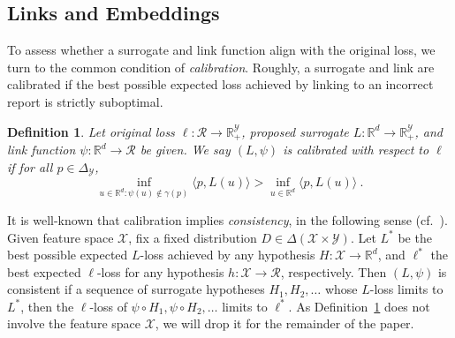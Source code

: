 \documentclass[12pt]{article}
\newcommand{\Comments}{1}
\newcommand{\mynote}[2]{\ifnum\Comments=1\textcolor{#1}{#2}\fi}
\newcommand{\mytodo}[2]{\ifnum\Comments=1%
  \todo[linecolor=#1!80!black,backgroundcolor=#1,bordercolor=#1!80!black]{#2}\fi}
\newcommand{\raf}[1]{\mynote{green}{[RF: #1]}}
\newcommand{\btw}[1]{}%
\newcommand{\reals}{\mathbb{R}}
\newcommand{\simplex}{\Delta_\Y}
\newcommand{\R}{\mathcal{R}}
\newcommand{\X}{\mathcal{X}}
\newcommand{\Y}{\mathcal{Y}}
\newcommand{\inprod}[2]{\langle #1, #2 \rangle}%
\newtheorem{definition}{Definition}
\begin{document}
\subsection{Links and Embeddings}

To assess whether a surrogate and link function align with the original loss, we turn to the common condition of \emph{calibration}.
Roughly, a surrogate and link are calibrated if the best possible expected loss achieved by linking to an incorrect report is strictly suboptimal.
\btw{Separated stuff commented out}



\begin{definition}
  \label{def:calibrated}
  Let original loss $\ell:\R\to\reals^\Y_+$, proposed surrogate $L:\reals^d\to\reals^\Y_+$, and link function $\psi:\reals^d\to\R$ be given.
  We say $(L,\psi)$ is \emph{calibrated} with respect to $\ell$ if
for all $p \in \simplex$,
  \begin{equation}
    \label{eq:calibrated}
  \inf_{u \in \reals^d : \psi(u) \not\in \gamma(p)} \inprod{p}{L(u)} > \inf_{u \in \reals^d} \inprod{p}{L(u)}~.
  \end{equation}
\end{definition}
It is well-known that calibration implies \emph{consistency}, in the following sense (cf.~\cite{agarwal2015consistent}).
Given feature space $\X$, fix a fixed distribution $D \in \Delta(\X\times\Y)$.
Let $L^*$ be the best possible expected $L$-loss achieved by any hypothesis $H:\X\to\reals^d$, and $\ell^*$ the best expected $\ell$-loss for any hypothesis $h:\X\to\R$, respectively.
Then $(L,\psi)$ is consistent if a sequence of surrogate hypotheses $H_1,H_2,\ldots$ whose $L$-loss limits to $L^*$, then the $\ell$-loss of $\psi\circ H_1,\psi \circ H_2, \ldots$ limits to $\ell^*$.
As Definition~\ref{def:calibrated} does not involve the feature space $\X$, we will drop it for the remainder of the paper.
\end{document}
